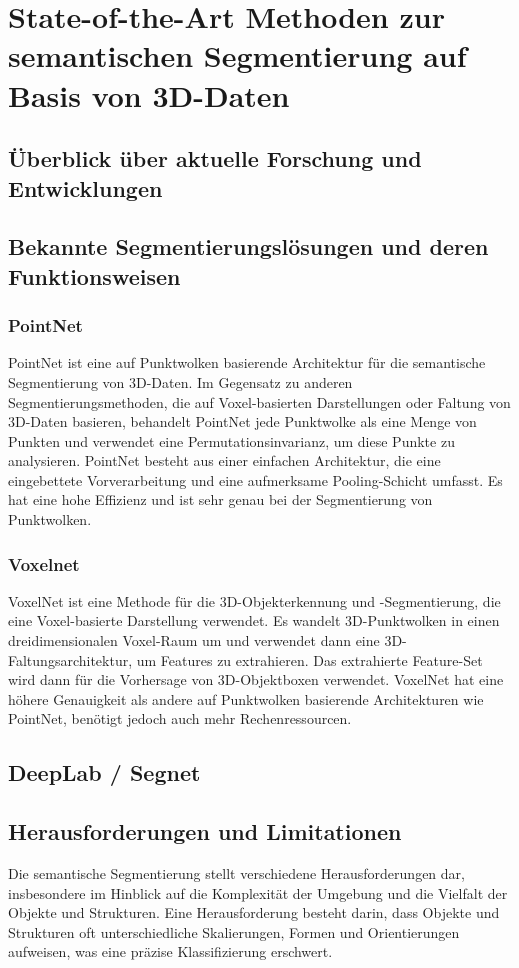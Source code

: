 \chapter{State-of-the-Art Methoden zur semantischen Segmentierung auf Basis von 3D-Daten}
\section{Überblick über aktuelle Forschung und Entwicklungen}
\section{Bekannte Segmentierungslösungen und deren Funktionsweisen}
\subsection{PointNet}
PointNet ist eine auf Punktwolken basierende Architektur für die semantische
Segmentierung von 3D-Daten. Im Gegensatz zu anderen Segmentierungsmethoden, die
auf Voxel-basierten Darstellungen oder Faltung von 3D-Daten basieren, behandelt
PointNet jede Punktwolke als eine Menge von Punkten und verwendet eine
Permutationsinvarianz, um diese Punkte zu analysieren. PointNet besteht aus
einer einfachen Architektur, die eine eingebettete Vorverarbeitung und eine
aufmerksame Pooling-Schicht umfasst. Es hat eine hohe Effizienz und ist sehr
genau bei der Segmentierung von Punktwolken.

\subsection{Voxelnet}
VoxelNet ist eine Methode für die 3D-Objekterkennung und -Segmentierung, die
eine Voxel-basierte Darstellung verwendet. Es wandelt 3D-Punktwolken in einen
dreidimensionalen Voxel-Raum um und verwendet dann eine 3D-Faltungsarchitektur,
um Features zu extrahieren. Das extrahierte Feature-Set wird dann für die
Vorhersage von 3D-Objektboxen verwendet. VoxelNet hat eine höhere Genauigkeit
als andere auf Punktwolken basierende Architekturen wie PointNet, benötigt
jedoch auch mehr Rechenressourcen.

\section{DeepLab / Segnet}


\section{Herausforderungen und Limitationen}
Die semantische Segmentierung stellt verschiedene Herausforderungen dar,
insbesondere im Hinblick auf die Komplexität der Umgebung und die Vielfalt der
Objekte und Strukturen. Eine Herausforderung besteht darin, dass Objekte und
Strukturen oft unterschiedliche Skalierungen, Formen und Orientierungen
aufweisen, was eine präzise Klassifizierung erschwert.

